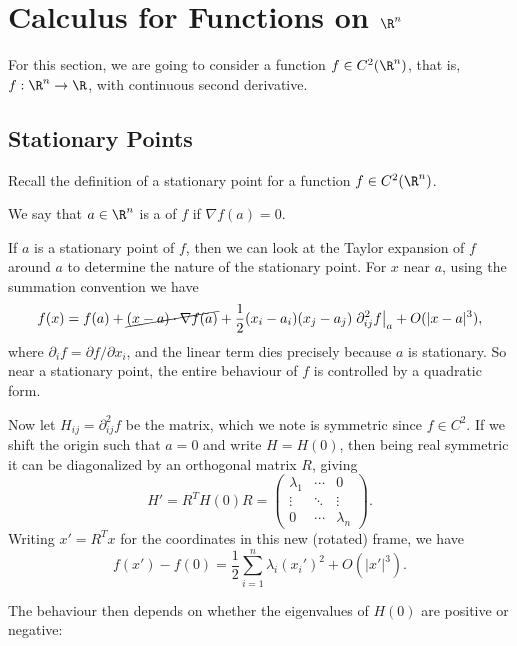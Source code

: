 \documentclass[a4paper]{scrartcl}
\begin{document}

\section{Calculus for Functions on \texorpdfstring{$\R^n$}{R-n}}

For this section, we are going to consider a function $f \in C^2(\R^n)$, that is, $f: \R^n \rightarrow \R$, with continuous second derivative.

\subsection{Stationary Points}

Recall the definition of a stationary point for a function $f \in C^2(\R^n)$.

\begin{definition}
	We say that $a \in \R^n$ is a  of $f$ if
	$\nabla f(a)= 0$.
\end{definition}

If $a$ is a stationary point of $f$, then we can look at the Taylor expansion of $f$ around $a$ to determine the nature of the stationary point. For $x$ near $a$, using the summation convention we have
$$
f(x) = f(a) + \cancel{(x - a) \cdot \nabla f(a)} + \frac{1}{2}(x_i - a_i)(x_j - a_j) \left.\partial^2_{ij} f \right|_a + O(|x - a|^3),
$$
where $\partial_i f = \partial f/\partial x_i$, and the linear term dies precisely because $a$ is stationary. So near a stationary point, the entire behaviour of $f$ is controlled by a quadratic form.

Now let $H_{ij} = \partial^2_{ij} f$ be the  matrix, which we note is symmetric since $f \in C^2$. If we shift the origin such that $a = 0$ and write $H = H(0)$, then being real symmetric it can be diagonalized by an orthogonal matrix $R$, giving
$$
H' = R^T H(0) R = \begin{pmatrix}
	\lambda_1 & \cdots & 0 \\
	\vdots& \ddots &\vdots \\
	0 &\cdots & \lambda_n
\end{pmatrix}.
$$
Writing $x' = R^T x$ for the coordinates in this new (rotated) frame, we have
$$
	f(x') - f(0) = \frac{1}{2}\sum_{i = 1}^n \lambda_i (x_i')^2 + O(|x'|^3).
$$

The behaviour then depends on whether the eigenvalues of $H(0)$ are positive or negative:
\end{document}

